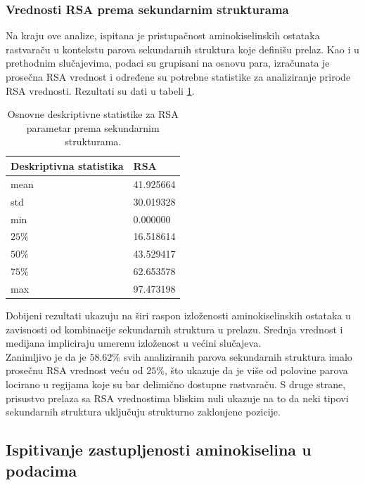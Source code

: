 \documentclass[a4paper,12pt]{article}
\begin{document}
\subsubsection{Vrednosti RSA prema sekundarnim strukturama}
Na kraju ove analize, ispitana je pristupačnost aminokiselinskih ostataka rastvaraču u kontekstu parova sekundarnih struktura koje definišu prelaz. Kao i u prethodnim slučajevima, podaci su grupisani na osnovu para, izračunata je prosečna RSA vrednost i određene su potrebne statistike za analiziranje prirode RSA vrednosti. Rezultati su dati u tabeli \ref{Tabela:12}.
\begin{table}[h!]
    \centering
    \begin{tabular}{ |l|l| } 
    \hline
    \textbf{Deskriptivna statistika} & \textbf{RSA} \\
    \hline
    mean & 41.925664 \\
    std  & 30.019328 \\
    min  & 0.000000 \\
    $25\%$  & 16.518614 \\
    $50\%$  & 43.529417 	\\
    $75\%$ & 62.653578\\
    max & 97.473198 	\\
    \hline
    \end{tabular}
    \caption{Osnovne deskriptivne statistike za RSA parametar prema sekundarnim strukturama.}
    \label{Tabela:12}
\end{table}

Dobijeni rezultati ukazuju na širi raspon izloženosti aminokiselinskih ostataka u zavisnosti od kombinacije sekundarnih struktura u prelazu. Srednja vrednost i medijana impliciraju umerenu izloženost u većini slučajeva. \\
Zanimljivo je da je $58.62\%$ svih analiziranih parova sekundarnih struktura imalo prosečnu RSA vrednost veću od $25\%$, što ukazuje da je više od polovine parova locirano u regijama koje su bar delimično dostupne rastvaraču. S druge strane, prisustvo prelaza sa RSA vrednostima bliskim nuli ukazuje na to da neki tipovi sekundarnih struktura uključuju strukturno zaklonjene pozicije.
\subsection{Ispitivanje zastupljenosti aminokiselina u podacima}
\end{document}
